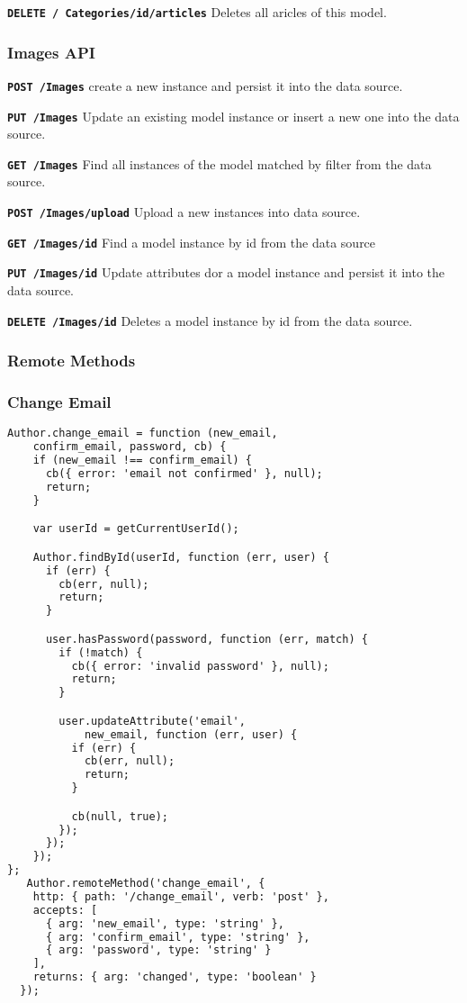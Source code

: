 \texttt{\textbf{DELETE / Categories/{id}/articles}} Deletes all aricles of this model.


\subsubsection{Images API}

\texttt{\textbf{POST /Images}} create a new instance and persist it into the data source.

\texttt{\textbf{PUT /Images}} Update an existing model instance or insert a new one into the data source.

\texttt{\textbf{GET /Images}} Find all instances of the model matched by filter from the data source.

\texttt{\textbf{POST /Images/upload}} Upload a new instances into data source.

\texttt{\textbf{GET /Images/{id}}} Find a model instance by id from the data source

\texttt{\textbf{PUT /Images/{id}}} Update attributes dor a model instance and persist it into the data source.

\texttt{\textbf{DELETE /Images/{id}}} Deletes a model instance by id from the data source.

\subsubsection{Remote Methods}

\subsubsection{Change Email}

\begin{lstlisting}[language=html]
Author.change_email = function (new_email, 
	confirm_email, password, cb) {
    if (new_email !== confirm_email) {
      cb({ error: 'email not confirmed' }, null);
      return;
    }

    var userId = getCurrentUserId();  

    Author.findById(userId, function (err, user) {
      if (err) {
        cb(err, null);
        return;
      }

      user.hasPassword(password, function (err, match) {
        if (!match) {
          cb({ error: 'invalid password' }, null);
          return;
        }

        user.updateAttribute('email', 
        	new_email, function (err, user) {
          if (err) {
            cb(err, null);
            return;
          }

          cb(null, true);
        });
	  });       
	});
};
   Author.remoteMethod('change_email', {
    http: { path: '/change_email', verb: 'post' },
    accepts: [
      { arg: 'new_email', type: 'string' },
      { arg: 'confirm_email', type: 'string' },
      { arg: 'password', type: 'string' }
    ],
    returns: { arg: 'changed', type: 'boolean' }
  });
\end{lstlisting}

